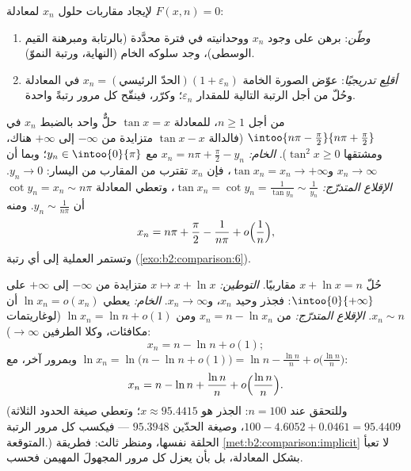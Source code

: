 \begin{method}\label{met:b2:comparison:implicit}
لإيجاد مقاربات حلول $x_n$ لمعادلة $F(x, n) =
0$:
\begin{enumerate}
  \item \emph{وطّن}: برهن على وجود $x_n$ ووحدانيته في
        فترة محدَّدة (بالرتابة ومبرهنة القيم
        الوسطى)، وجد سلوكه الخام (النهاية، ورتبة
        النموّ).
  \item \emph{أقلِع تدريجيًا}: عوّض الصورة الخامة $x_n = (\text{الحدّ
        الرئيسي})(1 + \varepsilon_n)$ في المعادلة وحُلّ من أجل
        الرتبة التالية للمقدار $\varepsilon_n$؛ وكرّر، فينقّح كل مرور
        رتبةً واحدة.
\end{enumerate}
\end{method}

\begin{example}\label{ex:b2:comparison:tan}
من أجل $n \geq 1$، للمعادلة $\tan x = x$ حلٌّ واحد بالضبط
$x_n$ في $\intoo{n\pi - \frac\pi2}{n\pi + \frac\pi2}$ (فالدالة
$\tan x - x$ متزايدة من $-\infty$ إلى $+\infty$ هناك، ومشتقها
$\tan^2 x \geq 0$). \emph{الخام:} $x_n = n\pi +
\frac\pi2 - y_n$ مع $y_n \in \intoo{0}{\pi}$؛ وبما أن $x_n \to
\infty$ و$\tan x_n = x_n \to +\infty$، فإن $x_n$ تقترب من
المقارب من اليسار: $y_n \to 0$. \emph{الإقلاع المتدرّج:} $\tan x_n =
\cot y_n = \frac{1}{\tan y_n} \sim \frac{1}{y_n}$، وتعطي المعادلة
$\cot y_n = x_n \sim n\pi$ أن $y_n \sim \frac{1}{n\pi}$. ومنه
\[
x_n = n\pi + \frac\pi2 - \frac{1}{n\pi} +
o\Bigl(\frac1n\Bigr),
\]
وتستمر العملية إلى أي رتبة
(\cref{exo:b2:comparison:6}).
\end{example}

\begin{example}\label{ex:b2:comparison:xplusln}
حُلّ $x + \ln x = n$ مقاربيًا. \emph{التوطين:} $x
\mapsto x + \ln x$ متزايدة من $-\infty$ إلى $+\infty$ على
$\intoo{0}{+\infty}$: فجذر وحيد $x_n$، و$x_n \to \infty$.
\emph{الخام:} يعطي $\ln x_n = o(x_n)$ أن $x_n \sim n$.
\emph{الإقلاع المتدرّج:} من $x_n = n - \ln x_n$ ومن $\ln x_n = \ln n
+ o(1)$ (لوغاريتمات مكافئات، وكلا الطرفين $\to \infty$):
\[
x_n = n - \ln n + o(1) ;
\]
وبمرور آخر، مع $\ln x_n = \ln\bigl(n - \ln n + o(1)\bigr) =
\ln n - \frac{\ln n}{n} + o\bigl(\frac{\ln n}n\bigr)$:
\[
x_n = n - \ln n + \frac{\ln n}{n} +
o\Bigl(\frac{\ln n}{n}\Bigr).
\]
(وللتحقق عند $n = 100$: الجذر هو $x \approx 95.4415$؛ وتعطي
صيغة الحدود الثلاثة $100 - 4.6052 + 0.0461 = 95.4409$، وصيغة
الحدّين $95.3948$ --- فيكسب كل مرور الرتبة المتوقعة.)
الحلقة نفسها، ومنظر ثالث: فطريقة
\cref{met:b2:comparison:implicit} لا تعبأ بشكل
المعادلة، بل بأن يعزل كل مرور المجهولَ المهيمن فحسب.
\end{example}

